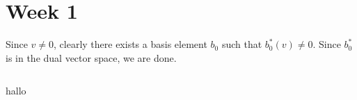 \section*{Week 1}

Since $v \neq 0$, clearly there exists a basis element $b_0$ such that $b_0^{\ast}(v) \neq 0$. Since $b_0^{\ast}$ is in the dual vector space, we are done.

$\newenvironment{theorem}{Theorem}{Bewijs}$

\begin{theorem}
hallo
\end{theorem}